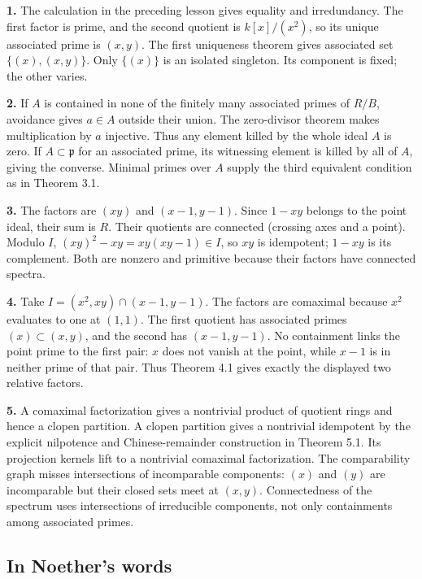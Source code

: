 \documentclass[
]{article}
\begin{document}
\textbf{1.} The calculation in the preceding lesson gives equality and
irredundancy. The first factor is prime, and the second quotient is
\(k[x]/(x^2)\), so its unique associated prime is \((x,y)\). The first
uniqueness theorem gives associated set \(\{(x),(x,y)\}\). Only
\(\{(x)\}\) is an isolated singleton. Its component is fixed; the other
varies.

\textbf{2.} If \(A\) is contained in none of the finitely many
associated primes of \(R/B\), avoidance gives \(a\in A\) outside their
union. The zero-divisor theorem makes multiplication by \(a\) injective.
Thus any element killed by the whole ideal \(A\) is zero. If
\(A\subset\mathfrak p\) for an associated prime, its witnessing element
is killed by all of \(A\), giving the converse. Minimal primes over
\(A\) supply the third equivalent condition as in Theorem 3.1.

\textbf{3.} The factors are \((xy)\) and \((x-1,y-1)\). Since \(1-xy\)
belongs to the point ideal, their sum is \(R\). Their quotients are
connected (crossing axes and a point). Modulo \(I\),
\((xy)^2-xy=xy(xy-1)\in I\), so \(xy\) is idempotent; \(1-xy\) is its
complement. Both are nonzero and primitive because their factors have
connected spectra.

\textbf{4.} Take \(I=(x^2,xy)\cap(x-1,y-1)\). The factors are comaximal
because \(x^2\) evaluates to one at \((1,1)\). The first quotient has
associated primes \((x)\subset(x,y)\), and the second has \((x-1,y-1)\).
No containment links the point prime to the first pair: \(x\) does not
vanish at the point, while \(x-1\) is in neither prime of that pair.
Thus Theorem 4.1 gives exactly the displayed two relative factors.

\textbf{5.} A comaximal factorization gives a nontrivial product of
quotient rings and hence a clopen partition. A clopen partition gives a
nontrivial idempotent by the explicit nilpotence and Chinese-remainder
construction in Theorem 5.1. Its projection kernels lift to a nontrivial
comaximal factorization. The comparability graph misses intersections of
incomparable components: \((x)\) and \((y)\) are incomparable but their
closed sets meet at \((x,y)\). Connectedness of the spectrum uses
intersections of irreducible components, not only containments among
associated primes.

\subsection{In Noether's words}\label{in-noethers-words}
\end{document}
